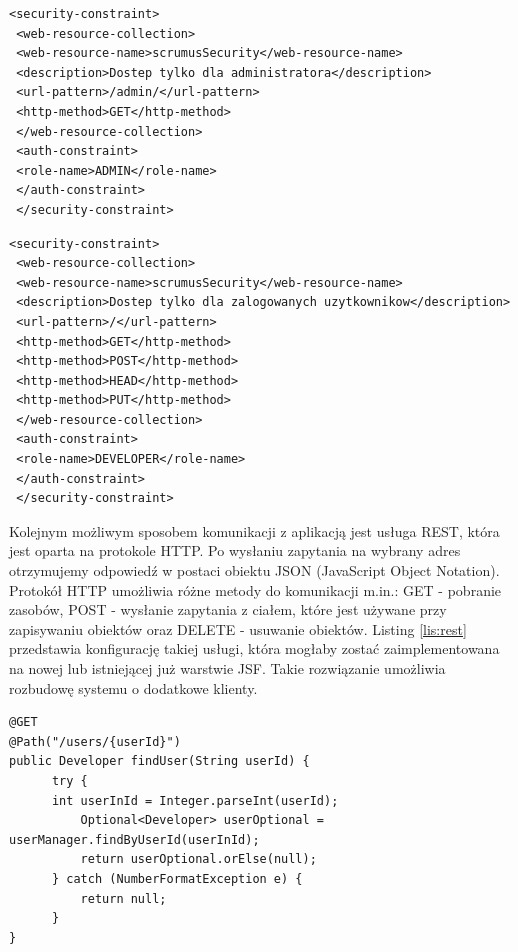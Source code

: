 \begin{lstlisting}[caption={Konfiguracja zabezpieczeń systemu scrumus - administrator}, label=lis:konf_zab_ad, numbers=none]
 <security-constraint>
 <web-resource-collection>
 <web-resource-name>scrumusSecurity</web-resource-name>
 <description>Dostep tylko dla administratora</description>
 <url-pattern>/admin/</url-pattern>
 <http-method>GET</http-method>
 </web-resource-collection>
 <auth-constraint>
 <role-name>ADMIN</role-name>
 </auth-constraint>
 </security-constraint>
 \end{lstlisting}
 \newpage
 \begin{lstlisting}[caption={Konfiguracja zabezpieczeń systemu scrumus - zalogowany użytkownik}, label=lis:konf_zab_zal, numbers=none]
 <security-constraint>
 <web-resource-collection>
 <web-resource-name>scrumusSecurity</web-resource-name>
 <description>Dostep tylko dla zalogowanych uzytkownikow</description>
 <url-pattern>/</url-pattern>
 <http-method>GET</http-method>
 <http-method>POST</http-method>
 <http-method>HEAD</http-method>
 <http-method>PUT</http-method>
 </web-resource-collection>
 <auth-constraint>
 <role-name>DEVELOPER</role-name>
 </auth-constraint>
 </security-constraint>\end{lstlisting}
 
 
 Kolejnym możliwym sposobem komunikacji z aplikacją jest usługa REST, która jest oparta na protokole HTTP. Po wysłaniu zapytania na wybrany adres otrzymujemy odpowiedź w postaci obiektu JSON (JavaScript Object Notation). Protokół HTTP umożliwia różne metody do komunikacji m.in.: GET - pobranie zasobów, POST - wysłanie zapytania z ciałem, które jest używane przy zapisywaniu obiektów oraz DELETE - usuwanie obiektów. Listing \ref{lis:rest} przedstawia konfigurację takiej usługi, która mogłaby zostać zaimplementowana na nowej lub istniejącej już warstwie JSF. Takie rozwiązanie umożliwia rozbudowę systemu o dodatkowe klienty.

\begin{lstlisting}[caption={Przykładowa usługa REST}, label=lis:rest, numbers=none]
@GET
@Path("/users/{userId}")
public Developer findUser(String userId) {
	  try {
	  int userInId = Integer.parseInt(userId);
		  Optional<Developer> userOptional = userManager.findByUserId(userInId);
		  return userOptional.orElse(null);
	  } catch (NumberFormatException e) {
		  return null;
	  }
}
\end{lstlisting}


